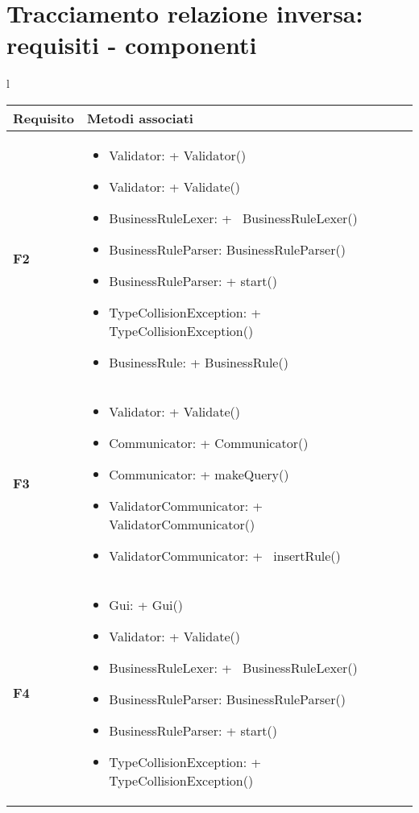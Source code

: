 \section{Tracciamento relazione inversa: requisiti - componenti}
\begin{tabular}{l}
\begin{tabular}{||p{2cm}||p{10cm}||} \hline
\textbf{Requisito} & {Metodi associati} \\ \hline
\textbf{F2} & 
\begin{itemize}
\item Validator: + Validator()
\item Validator: + Validate()
\item BusinessRuleLexer: +~ BusinessRuleLexer()
\item BusinessRuleParser: BusinessRuleParser()
\item BusinessRuleParser: + start()
\item TypeCollisionException: +~ TypeCollisionException()
\item BusinessRule: + BusinessRule()
\end{itemize} \\ \hline
\textbf{F3} &
\begin{itemize}
\item Validator: + Validate()
\item Communicator: + Communicator()
\item Communicator: + makeQuery()
\item ValidatorCommunicator: +~ ValidatorCommunicator()
\item ValidatorCommunicator: +~ insertRule()
\end{itemize} \\ \hline
\textbf{F4} & 
\begin{itemize}
\item Gui: + Gui()
\item Validator: + Validate()
\item BusinessRuleLexer: +~ BusinessRuleLexer()
\item BusinessRuleParser: BusinessRuleParser()
\item BusinessRuleParser: + start()
\item TypeCollisionException: +~ TypeCollisionException()
\end{itemize} \\ \hline
\end{tabular} \\
\end{tabular}

